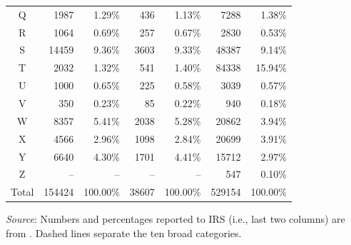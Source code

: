 \documentclass[11pt]{article}
\begin{document}
\begin{table}[t]
\begin{threeparttable}
\begin{tabularx}{\textwidth}{c|r|r|r|r|r|r}
			\hdashline
			Q & \num{1987} & \num{1.29}\% & \num{436} & \num{1.13}\% & \num{7288} & \num{1.38}\% \\
			\hdashline
			R & \num{1064} & \num{0.69}\% & \num{257} & \num{0.67}\% & \num{2830} & \num{0.53}\% \\
			S & \num{14459} & \num{9.36}\% & \num{3603} & \num{9.33}\% & \num{48387} & \num{9.14}\% \\
			T & \num{2032} & \num{1.32}\% & \num{541} & \num{1.40}\% & \num{84338} & \num{15.94}\% \\
			U & \num{1000} & \num{0.65}\% & \num{225} & \num{0.58}\% & \num{3039} & \num{0.57}\% \\
			V & \num{350} & \num{0.23}\% & \num{85} & \num{0.22}\% & \num{940} & \num{0.18}\% \\
			W & \num{8357} & \num{5.41}\% & \num{2038} & \num{5.28}\% & \num{20862} & \num{3.94}\% \\
			\hdashline
			X & \num{4566} & \num{2.96}\% & \num{1098} & \num{2.84}\% & \num{20699} & \num{3.91}\% \\
			\hdashline
			Y & \num{6640} & \num{4.30}\% & \num{1701} & \num{4.41}\% & \num{15712} & \num{2.97}\% \\
			\hdashline
			Z & -- & -- & -- & -- & \num{547} & \num{0.10}\% \\
			\hline
			Total & \num{154424} & \num{100.00}\% & \num{38607} & \num{100.00}\% & \num{529154} & \num{100.00}\% \\
         \hline
    \end{tabularx}
    \begin{tablenotes}
    \item\footnotesize \textit{Source}: Numbers and percentages reported to IRS (i.e., last two columns) are from \textcite{McKeeverNonprofitAlmanacEssential2016}. Dashed lines separate the ten broad categories.
    \end{tablenotes}
    \end{threeparttable}
\end{table}

\end{document}
